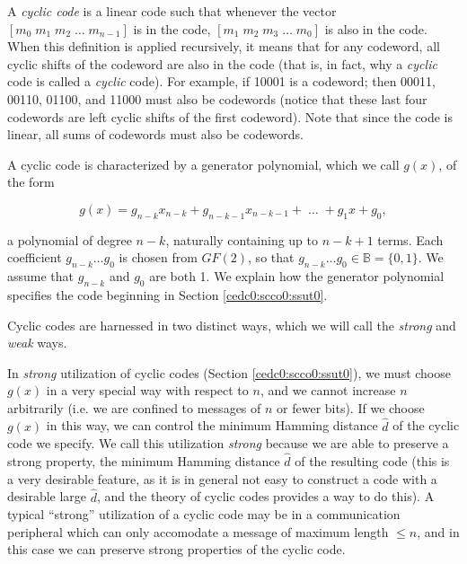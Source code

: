 A \emph{cyclic code} is a linear code such that whenever
the vector $[m_0 \; m_1 \; m_2 \; \ldots{} \; m_{n-1}]$ is in the code, 
$[m_1 \; m_2 \; m_3 \; \ldots{} \; m_0]$ is also in the code.  When
this definition is applied recursively, it means that for any codeword, all
cyclic shifts of the codeword are also in the code (that is, in fact, why
a \emph{cyclic} code is called a \emph{cyclic} code).  For example, if 
10001 is a codeword; then 00011, 00110, 01100, and 11000 must also be
codewords (notice that these last four codewords are left cyclic shifts of the 
first codeword).  Note that since the code is linear, all sums of codewords 
must also be codewords.

A cyclic code is characterized by a generator polynomial, which we call
$g(x)$, of the form 

\begin{equation}
\label{eq:cedc0:scco0:sdpo0:01}
g(x) = g_{n-k} x_{n-k} + g_{n-k-1} x_{n-k-1} + \; \ldots \; + g_1 x + g_0,
\end{equation}

\noindent{}a polynomial of degree $n-k$, naturally containing up to $n-k+1$ terms.
Each coefficient $g_{n-k} \ldots g_{0}$ is chosen from $GF(2)$, so that
$g_{n-k} \ldots g_{0} \in \mathbb{B} = \{ 0 , 1 \}$.  We assume that
$g_{n-k}$ and $g_{0}$ are both 1.  We explain how the generator polynomial
specifies the code beginning in Section \ref{cedc0:scco0:ssut0}.

Cyclic codes are harnessed in two distinct ways, which we will call
the \emph{strong} and \emph{weak} ways.

In \emph{strong} utilization of cyclic codes
(Section \ref{cedc0:scco0:ssut0}), we must choose $g(x)$ in a very
special way with respect to $n$, and we cannot increase
$n$ arbitrarily (i.e. we are confined to messages of $n$ or
fewer bits).  If we choose $g(x)$ in this way, we can
control the minimum Hamming distance $\hat{d}$ of the cyclic code we specify.
We call this utilization \emph{strong} because we are able to preserve a 
strong property, the minimum Hamming distance $\hat{d}$ of the resulting code
(this is a very desirable feature, as it is in general not easy to construct a code
with a desirable large $\hat{d}$, and the theory of cyclic codes provides a way to do
this).
A typical ``strong'' utilization of a cyclic code may be in a communication peripheral
which can only accomodate a message of maximum length $\leq n$, and in this case
we can preserve strong properties of the cyclic code.

